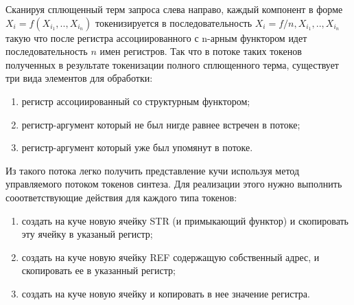 Сканируя сплющенный терм запроса слева направо, каждый компонент в форме
$X_i=f(X_{i_1},..,X_{i_n})$ токенизируется в последовательность
$X_i=f/n,X_{i_1},..,X_{i_n}$ такую что после регистра ассоциированного с n-арным
функтором идет последовательность $n$ имен регистров. Так что в потоке таких
токенов полученных в результате токенизации полного сплющенного терма,
существует три вида элементов для обработки:
\begin{enumerate}
  \item 
регистр ассоциированный со структурным функтором;
  \item 
регистр-аргумент который не был нигде равнее встречен в потоке;
  \item 
регистр-аргумент который уже был упомянут в потоке.
\end{enumerate}

Из такого потока легко получить представление кучи используя метод управляемого
потоком токенов синтеза. Для реализации этого нужно выполнить сооответствующие
действия для каждого типа токенов:
\begin{enumerate}
  \item 
создать на куче новую ячейку STR (и примыкающий функтор) и скопировать эту
ячейку в указаный регистр;
  \item 
создать на куче новую ячейку REF содержащую собственный адрес, и скопировать
ее в указанный регистр;
  \item 
создать на куче новую ячейку и копировать в нее значение регистра.
\end{enumerate}

